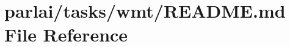 \hypertarget{parlai_2tasks_2wmt_2README_8md}{}\section{parlai/tasks/wmt/\+R\+E\+A\+D\+ME.md File Reference}
\label{parlai_2tasks_2wmt_2README_8md}
